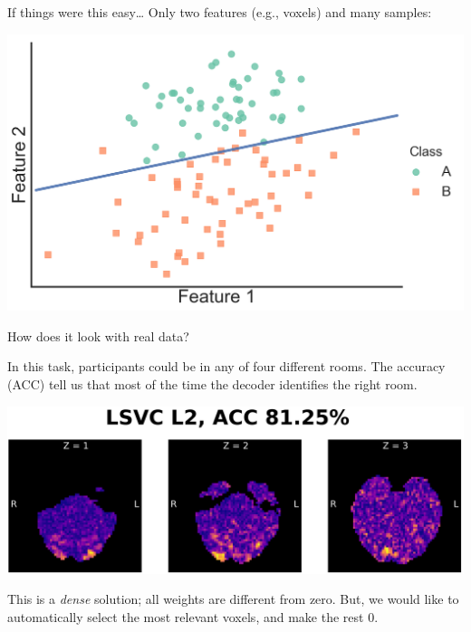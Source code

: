\documentclass[11pt]{beamer}
\begin{document}
\begin{frame}{If things were this easy\ldots}
    Only two features (e.g., voxels) and many samples:

    \begin{center}
        \includegraphics[scale=0.3]{figures/grad_descent_result.png}        
    \end{center}
\end{frame}

\begin{frame}[t]{How does it look with real data?}

    In this task, participants could be in any of four different rooms. The
    accuracy (ACC) tell us that most of the time the decoder identifies the
    right room.

    \begin{center}
        \includegraphics[scale=0.7]{figures/lsvc_l2-axial.png}
    \end{center}

    This is a \emph{dense} solution; all weights are different from zero. But,
    we would like to automatically select the most relevant voxels, and
    make the rest 0.

\end{frame}
\end{document}
